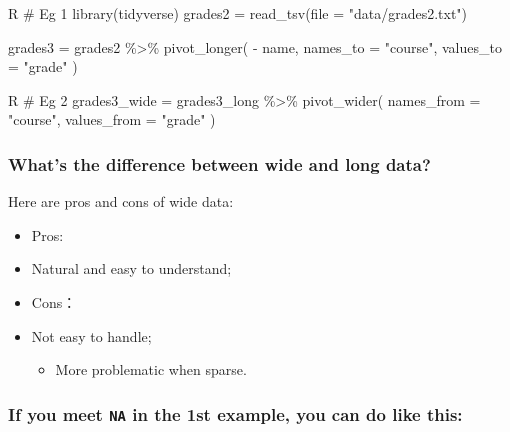 \documentclass[
]{article}
\newenvironment{Shaded}{}{}
\newcommand{\NormalTok}[1]{#1}
\begin{document}
\begin{Shaded}
\begin{Highlighting}[]
\NormalTok{\textasciigrave{}\textasciigrave{}\textasciigrave{}R}
\NormalTok{\# Eg 1}
\NormalTok{library(tidyverse)}
\NormalTok{grades2 =}
\NormalTok{	read\_tsv(file = "data/grades2.txt")}

\NormalTok{grades3 =}
\NormalTok{	grades2 \%\textgreater{}\% }
\NormalTok{	pivot\_longer( }
\NormalTok{    {-} name,}
\NormalTok{    names\_to = "course",}
\NormalTok{    values\_to = "grade"}
\NormalTok{  )}
\NormalTok{\textasciigrave{}\textasciigrave{}\textasciigrave{}}

\NormalTok{\textasciigrave{}\textasciigrave{}\textasciigrave{}R}
\NormalTok{\# Eg 2}
\NormalTok{grades3\_wide = grades3\_long \%\textgreater{}\% }
\NormalTok{  pivot\_wider(}
\NormalTok{    names\_from = "course",}
\NormalTok{    values\_from = "grade"}
\NormalTok{  )}
\NormalTok{\textasciigrave{}\textasciigrave{}\textasciigrave{}}
\end{Highlighting}
\end{Shaded}

\hypertarget{whats-the-difference-between-wide-and-long-data}{%
\subsubsection{What's the difference between wide and long
data?}\label{whats-the-difference-between-wide-and-long-data}}

Here are pros and cons of wide data:

\begin{itemize}
\item
  Pros:
\item
  Natural and easy to understand;
\item
  Cons：
\item
  Not easy to handle;

  \begin{itemize}
  \item
    More problematic when sparse.
  \end{itemize}
\end{itemize}

\hypertarget{if-you-meet-na-in-the-1st-example-you-can-do-like-this}{%
\subsubsection{\texorpdfstring{If you meet \texttt{NA} in the 1st
example, you can do like
this:}{If you meet NA in the 1st example, you can do like this:}}\label{if-you-meet-na-in-the-1st-example-you-can-do-like-this}}
\end{document}
